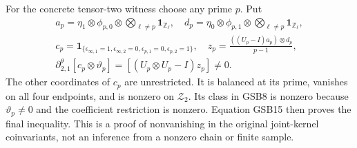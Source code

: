 For the concrete tensor-two witness choose any prime $p$. Put
\begin{equation}\tag{GSB21}
\begin{gathered}
a_p=\eta_1\otimes\phi_{p,0}\otimes
                       \bigotimes_{\ell\ne p}\mathbf1_{\mathbb Z_\ell},\quad
d_p=\eta_0\otimes\phi_{p,1}\otimes
                       \bigotimes_{\ell\ne p}\mathbf1_{\mathbb Z_\ell},\\
c_p=\mathbf1_{\{\epsilon_{\infty,1}=1,\epsilon_{\infty,2}=0,
                    \epsilon_{p,1}=0,\epsilon_{p,2}=1\}},\quad
z_p=\frac{((U_p-I)a_p)\otimes d_p}{p-1},\\
\partial^\theta_{2,1}[c_p\otimes\vartheta_p]
       =[(U_p\otimes U_p-I)z_p]\ne0.
\end{gathered}
\end{equation}
The other coordinates of $c_p$ are unrestricted. It is balanced
at its prime, vanishes on all four endpoints, and is nonzero on
$\mathcal Z_2$. Its class in GSB8 is nonzero because
$\vartheta_p\ne0$ and the coefficient restriction is nonzero.
Equation GSB15 then proves the final inequality. This is a proof
of nonvanishing in the original joint-kernel coinvariants, not
an inference from a nonzero chain or finite sample.


